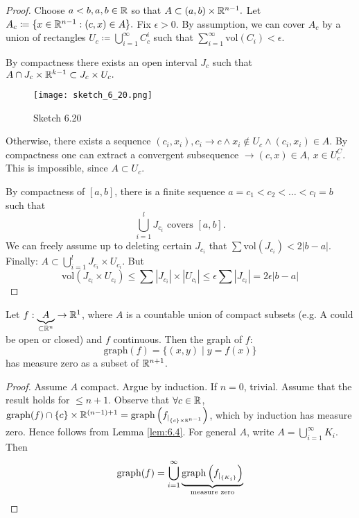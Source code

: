 \begin{proof}
    Choose \(a<b,a,b\in \mathbb{R}\) so that \(A\subset (a,b)\times \mathbb{R}^{n-1}.\) Let \(A_c\coloneqq\{x\in\mathbb{R}^{n-1}:(c,x)\in A\}.\)
    Fix \(\epsilon>0.\) By assumption, we can cover \(A_c\) by a union of rectangles \(U_c\coloneqq \bigcup_{i=1}^\infty C_c^i\)
    such that \(\sum_{i=1}^\infty\text{vol} (C_i)<\epsilon\).

    By compactness there exists an open interval \(J_c\) such that \(A\cap J_c\times \mathbb{R}^{k-1}\subset J_c\times U_c.\)
    \begin{figure}[H]\label{fig:6.20}
        \centering
        \texttt{[image: sketch\_6\_20.png]}
        \caption{Sketch 6.20}
    \end{figure}
    Otherwise, there exists a sequence \((c_i,x_i),c_i\to c\land x_i\notin U_c\land (c_i,x_i)\in A\). By compactness one can extract a 
    convergent subsequence \(\to (c,x)\in A\), \(x\in U_c^C\). This is impossible, since 
    \(A\subset U_c\). 

    By compactness of \([a,b]\), there is a finite sequence \(a=c_1<c_2<\dots<c_l=b\) such that 
    \[\bigcup_{i=1}^l J_{c_i}\text{ covers } [a,b].\]
    We can freely assume up to deleting certain \(J_{c_i}\) that \(\sum \text{vol}(J_{c_i})<2|b-a|\). 
    Finally: \(A\subset \bigcup_{i=1}^l J_{c_i}\times U_{c_i}\). But 
    \[\text{vol}(J_{c_i}\times U_{c_i})\leq \sum |J_{c_i}|\times |U_{c_i}|\leq \epsilon\sum |J_{c_i}|=2\epsilon|b-a|\]
\end{proof}

\begin{corollary}\label{cor:6.5}
    Let \(f:\underbrace{A}_{\subset \mathbb{R}^n}\to\mathbb{R}^{1}\), where \(A\) is a countable union of compact subsets (e.g. A could be open or closed) and \(f\) continuous.
    Then the graph of \(f\): \[\text{graph}(f)=\{(x,y)\mid y=f(x)\}\]
    has measure zero as a subset of \(\mathbb{R}^{n+1}\). 
\end{corollary}

\begin{proof}
    Assume \(A\) compact. Argue by induction. If \(n=0\), trivial. Assume that the result holds for \(\leq n+1\).
    Observe that \(\forall c\in\mathbb{R}\), \(\text{graph}(f)\cap\{c\}\times \mathbb{R}^{(n-1)+1}=\text{graph}\left(f_{|_{\{c\}\times \mathbb{R}^{n-1}}}\right)\), which by induction has measure zero. 
    Hence follows from Lemma \ref{lem:6.4}. For general \(A\), write \(A=\bigcup_{i=1}^\infty K_i\). Then 
    \[\text{graph}(f)=\bigcup_{i=1}^\infty\underbrace{\text{graph}\left(f_{|_{\{K_i\}}}\right)}_{\text{measure zero}}\]
\end{proof}


